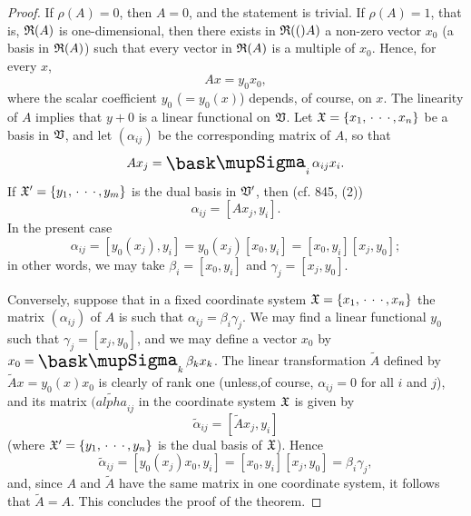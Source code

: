\begin{proof}
    If \(\rho(A) = 0\), then \(A = 0\), and the statement is trivial. If
    \(\rho(A) = 1\), that is, \(\frak{R}(A)\) is one-dimensional, then there
    exists in \(\frak{R}(()A)\) a non-zero vector \(x_0\) (a basis in \(\frak{R}(A)\))
    such that every vector in \(\frak{R}(A)\) is a multiple of \(x_0\). Hence, for
    every \(x\),
    \begin{equation*}
        Ax = y_0 x_0,
    \end{equation*}
    where the scalar coefficient \(y_0\) (\(= y_0(x)\)) depends, of course, on
    \(x\). The linearity of \(A\) implies that \(y+0\) is a linear functional on
    \(\mathfrak{V}\). Let \(\mathfrak{X} = \{x_1, \,\cdot\,\cdot\,\cdot\,, x_n\}\) be a
    basis in \(\mathfrak{V}\), and let \((\alpha_{ij})\) be the corresponding matrix
    of \(A\), so that
    \begin{equation*}
        Ax_j = \sumx_i \alpha_{ij} x_i.
    \end{equation*}
    If \(\mathfrak{X}' = \{y_1, \,\cdot\,\cdot\,\cdot\,, y_m\}\) is the dual basis in
    \(\mathfrak{V}'\), then (cf. 845, (2)) 
    \begin{equation*}
        \alpha_{ij} = [Ax_j, y_i].
    \end{equation*}
    In the present case
    \begin{equation*}
        \alpha_{ij} = [y_0(x_j), y_i] = y_0(x_j)[x_0, y_i] = [x_0, y_i][x_j, y_0];
    \end{equation*}
    in other words, we may take \(\beta_i = [x_0, y_i]\) and \(\gamma_j = [x_j, y_0]\).

    Conversely, suppose that in a fixed coordinate system \(\mathfrak{X} = \{x_1,
    \,\cdot\,\cdot\,\cdot\,, x_n\}\)  the matrix \((\alpha_{ij})\) of \(A\) is
    such that \(\alpha_{ij} = \beta_i \gamma_j\). We may find a linear
    functional \(y_0\) such that \(\gamma_j = [x_j, y_0]\), and we may define a
    vector \(x_0\) by \(x_0 = \sumx_k \beta_k x_k\). The linear transformation
    \(\tilde{A}\) defined by \(\tilde{A}x = y_0(x)x_0\) is clearly of rank one
    (unless,of course, \(\alpha_{ij} = 0\) for all \(i\) and \(j\)), and its
    matrix \((\tilde{alpha}_{ij}\) in the coordinate system \(\mathfrak{X}\) is given
    by
    \begin{equation*}
        \tilde{\alpha}_{ij} = [\tilde{A}x_j, y_i]
    \end{equation*}
    (where \(\mathfrak{X}' = \{y_1, \,\cdot\,\cdot\,\cdot\,, y_n\}\) is the dual basis
    of \(\mathfrak{X}\)). Hence
    \begin{equation*}
        \tilde{\alpha}_{ij} = [y_0(x_j)x_0, y_i] = [x_0, y_i][x_j, y_0] =
        \beta_i \gamma_j,
    \end{equation*}
    and, since \(A\) and \(\tilde{A}\) have the same matrix in one coordinate
    system, it follows that \(\tilde{A} = A\). This concludes the proof of the
    theorem.
\end{proof}

